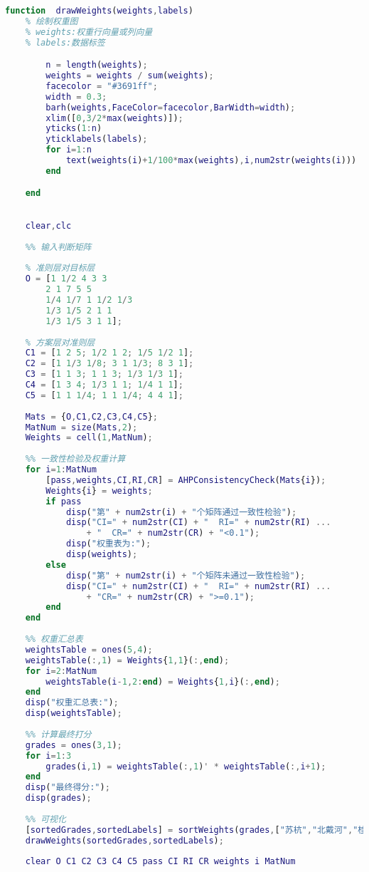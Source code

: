 \documentclass[withoutpreface]{cumcmthesis}
\begin{document}
    \begin{lstlisting}[language=matlab,caption={drawWeights.m}]
    function  drawWeights(weights,labels)
    % 绘制权重图
    % weights:权重行向量或列向量
    % labels:数据标签

        n = length(weights);
        weights = weights / sum(weights);
        facecolor = "#3691ff";
        width = 0.3;
        barh(weights,FaceColor=facecolor,BarWidth=width);
        xlim([0,3/2*max(weights)]);
        yticks(1:n)
        yticklabels(labels);
        for i=1:n
            text(weights(i)+1/100*max(weights),i,num2str(weights(i)))
        end

    end
    \end{lstlisting}
    
    \begin{lstlisting}[language=matlab,caption={main.m}]
    % 通过层次分析法选择最佳旅游地

    clear,clc
    
    %% 输入判断矩阵
    
    % 准则层对目标层
    O = [1 1/2 4 3 3
        2 1 7 5 5
        1/4 1/7 1 1/2 1/3
        1/3 1/5 2 1 1
        1/3 1/5 3 1 1];
    
    % 方案层对准则层
    C1 = [1 2 5; 1/2 1 2; 1/5 1/2 1];
    C2 = [1 1/3 1/8; 3 1 1/3; 8 3 1];
    C3 = [1 1 3; 1 1 3; 1/3 1/3 1];
    C4 = [1 3 4; 1/3 1 1; 1/4 1 1];
    C5 = [1 1 1/4; 1 1 1/4; 4 4 1];
    
    Mats = {O,C1,C2,C3,C4,C5};
    MatNum = size(Mats,2);
    Weights = cell(1,MatNum);
    
    %% 一致性检验及权重计算
    for i=1:MatNum
        [pass,weights,CI,RI,CR] = AHPConsistencyCheck(Mats{i});
        Weights{i} = weights;
        if pass
            disp("第" + num2str(i) + "个矩阵通过一致性检验");
            disp("CI=" + num2str(CI) + "  RI=" + num2str(RI) ...
                + "  CR=" + num2str(CR) + "<0.1");
            disp("权重表为:");
            disp(weights);
        else
            disp("第" + num2str(i) + "个矩阵未通过一致性检验");
            disp("CI=" + num2str(CI) + "  RI=" + num2str(RI) ...
                + "CR=" + num2str(CR) + ">=0.1");
        end
    end
    
    %% 权重汇总表
    weightsTable = ones(5,4);
    weightsTable(:,1) = Weights{1,1}(:,end);
    for i=2:MatNum
        weightsTable(i-1,2:end) = Weights{1,i}(:,end);
    end
    disp("权重汇总表:");
    disp(weightsTable);
    
    %% 计算最终打分
    grades = ones(3,1);
    for i=1:3
        grades(i,1) = weightsTable(:,1)' * weightsTable(:,i+1);
    end
    disp("最终得分:");
    disp(grades);
    
    %% 可视化
    [sortedGrades,sortedLabels] = sortWeights(grades,["苏杭","北戴河","桂林"]);
    drawWeights(sortedGrades,sortedLabels);
    
    clear O C1 C2 C3 C4 C5 pass CI RI CR weights i MatNum 
        

    \end{lstlisting}
\end{document}
